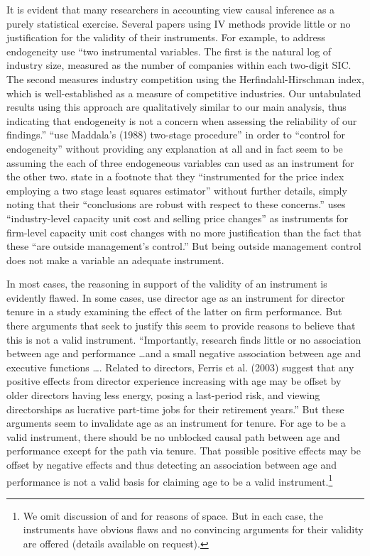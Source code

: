 \documentclass[11pt]{amsart}
\begin{document}
It is evident that many researchers in accounting view causal inference as a purely statistical exercise.
Several papers using IV methods  provide little or no justification for the validity of their instruments.
For example, to address endogeneity \citet{Cohen:2014jl} use ``two instrumental variables. The first is the natural log of industry size, measured as the number of companies within each two-digit SIC. The second measures industry competition using the Herfindahl-Hirschman index, which is well-established as a measure of competitive industries. Our untabulated results using this approach are qualitatively similar to our main analysis, thus indicating that endogeneity is not a concern when assessing the reliability of our findings.''
\citet{Vermeer:2014bs} ``use Maddala's (1988) two-stage procedure'' in order to ``control for endogeneity'' without providing any explanation at all and in fact seem to be assuming the each of three endogeneous variables can used as an instrument for the other two.
\citet[p.48]{Fox:2014io} state in a footnote that they ``instrumented for the price index employing a two stage least squares estimator'' without further details, simply noting that their ``conclusions are robust with respect to these concerns.''
\citet{Cannon:2014im} uses ``industry-level capacity unit cost and selling price changes'' as instruments for firm-level capacity unit cost changes with no more justification than the fact that these ``are outside management's control.'' But being outside management control does not make a variable an adequate instrument.

In most cases, the reasoning in support of the validity of an instrument is evidently flawed. In some cases,\citet{Kim:2014fm} use director age as an instrument for director tenure in a study examining the effect of the latter on firm performance. But there  arguments that seek to justify this seem to provide reasons to believe that this is not a valid instrument. 
``Importantly, research finds little or no association between age and performance \dots and a small negative association between age and executive functions \dots. 
Related to directors, Ferris et al. (2003) suggest that any positive effects from director experience increasing with age may be offset by older directors having less energy, posing a last-period risk, and viewing directorships as lucrative part-time jobs for their retirement years.'' 
But these arguments seem to invalidate age as an instrument for tenure. 
For age to be a valid instrument, there should be no unblocked causal path between age and performance except for the path via tenure.
 That possible positive effects may be offset by negative effects and thus detecting an association between age and performance is not a valid basis for claiming age to be a valid instrument.\footnote{
We omit discussion of  \citet{Erkens:2014hj,Houston:2014hv} and \citet{deFranco:2014ct} for reasons of space. But in each case, the instruments have obvious flaws and no convincing arguments for their validity are offered (details available on request).}
\end{document}
